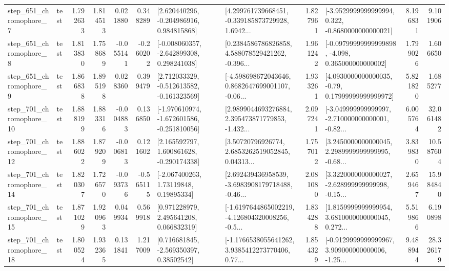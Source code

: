\begin{tabular}{llrrrrllrlrr}
   step\_651\_chromophore\_7 &      test &      1.792633 &    1.814513 &      0.021880 &  0.348289 &    [2.620440296, -0.204986916, 0.984815868] &  [4.299761739668451, -0.339185873729928, 1.6942... &       1.827961 &  [-3.9529999999999994, 0.322, -0.8680000000000021] &            8.196831 &          9.101906 \\
   step\_651\_chromophore\_8 &      test &      1.813830 &    1.758689 &     -0.055141 & -0.260202 &   [-0.008060357, -2.642899308, 0.298241038] &  [0.2384586786826858, 4.588078529421262, -0.396... &       1.961242 &  [-0.09799999999999898, -4.098, 0.365000000000002] &            1.799026 &          1.606650 \\
   step\_651\_chromophore\_9 &      test &      1.866838 &    1.895198 &      0.028360 &  0.399479 &   [2.712033329, -0.512613582, -0.161323569] &  [-4.598698672043646, 0.8682647699001107, -0.06... &       1.933261 &   [4.0930000000000035, -0.79, 0.17999999999999972] &            5.821820 &          1.685277 \\
  step\_701\_chromophore\_10 &      test &      1.888199 &    1.883316 &     -0.004883 &  0.136850 &  [-1.970610974, -1.672601586, -0.251810056] &  [2.9899044693276884, 2.395473871779853, -1.432... &       2.097241 &  [-3.049999999999997, -2.710000000000001, -0.82... &            6.005764 &         32.061482 \\
  step\_701\_chromophore\_12 &      test &      1.886022 &    1.879209 &     -0.006813 &  0.121602 &    [2.165592797, 1.600861628, -0.290174338] &  [3.50720796926774, 2.6853262519052845, 0.04313... &       1.757012 &  [3.2450000000000045, 2.2989999999999995, -0.68... &            3.839830 &         10.587604 \\
  step\_701\_chromophore\_14 &      test &      1.820307 &    1.726570 &     -0.093736 & -0.565115 &      [-2.067400263, 1.73119848, 0.19895334] &  [2.692439436958539, -3.6983908179718488, -0.46... &       2.081080 &  [3.3220000000000027, -2.628999999999998, -0.15... &            2.659467 &         15.984840 \\
  step\_701\_chromophore\_15 &      test &      1.871029 &    1.920963 &      0.049934 &  0.569918 &     [0.971228979, 2.495641208, 0.066832319] &  [-1.6197644865002219, -4.126804320008256, -0.5... &       1.834288 &  [1.8159999999999954, 3.6810000000000045, 0.272... &            5.519866 &          6.190898 \\
  step\_701\_chromophore\_18 &      test &      1.800524 &    1.932365 &      0.131841 &  1.217009 &     [0.716681845, -2.569350397, 0.38502542] &  [-1.1766538055641262, 3.9385412273770406, 0.77... &       1.854329 &  [-0.9129999999999967, 3.909000000000006, -1.25... &            9.488944 &         28.326179 \\

\end{tabular}
